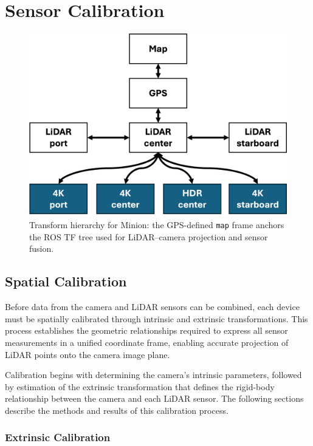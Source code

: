 \documentclass{erauthesis}
\begin{document}
\section{Sensor Calibration} \label{sec:calibration}


\begin{figure}[htbp]
    \centering
    \includegraphics[width=0.7\linewidth]{Images/tf_tree_1.png}
    \caption{Transform hierarchy for Minion: the GPS-defined \texttt{map} frame anchors the ROS TF tree used for LiDAR–camera projection and sensor fusion.}
    \label{fig:tf_tree}
\end{figure}

\subsection{Spatial Calibration} \label{spatial_calibration}

Before data from the camera and \ac{LiDAR} sensors can be combined, each device must be spatially calibrated through intrinsic and extrinsic transformations.  
This process establishes the geometric relationships required to express all sensor measurements in a unified coordinate frame, enabling accurate projection of \ac{LiDAR} points onto the camera image plane.

Calibration begins with determining the camera’s intrinsic parameters, followed by estimation of the extrinsic transformation that defines the rigid-body relationship between the camera and each \ac{LiDAR} sensor.  
The following sections describe the methods and results of this calibration process.

\subsubsection{Extrinsic Calibration} \label{extrinsic_tform}

\end{document}
